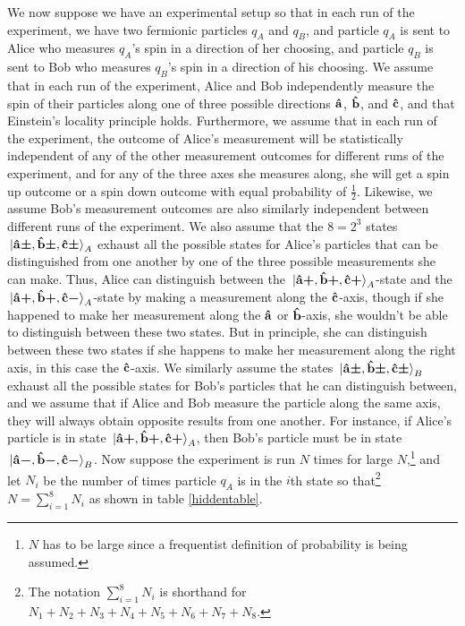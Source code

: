       We now suppose we have an experimental setup so that in each run of the experiment, we have two fermionic particles $q_A$ and $q_B$,  and particle $q_A$ is sent to Alice who measures $q_A$'s spin in a direction of her choosing, and particle $q_B$ is sent to Bob who measures $q_B$'s spin in a direction of his choosing. We assume that in each run of the experiment, Alice and Bob independently measure the spin of their particles along one of three possible directions $\vb{\hat{{a}}}$, $\vb{\hat{{b}}}$, and $\vb{\hat{{c}}}$, and that Einstein's locality principle holds. Furthermore, we assume that in each run of the experiment, the outcome of Alice's measurement will be statistically independent of any of the other measurement outcomes for different runs of the experiment, and for any of the three axes she measures along, she will get a spin up outcome or a spin down outcome with equal probability of $\frac{1}{2}.$ Likewise, we assume Bob's measurement outcomes are also similarly independent between different runs of the experiment. We also assume that the $8=2^3$ states $\ket*{\vb{\hat{{a}}}\bm{\pm},\vb{\hat{{b}}}\bm{\pm},\vb{\hat{{c}}}\bm{\pm}}_A$ exhaust all the possible states for Alice's particles that can be distinguished from one another by one of the three possible measurements she can make. Thus, Alice can distinguish between the $\ket*{\vb{\hat{{a}}}\bm{+},\vb{\hat{{b}}}\bm{+},\vb{\hat{{c}}}\bm{+}}_A$-state and the $\ket*{\vb{\hat{{a}}}\bm{+},\vb{\hat{{b}}}\bm{+},\vb{\hat{{c}}}\bm{-}}_A$-state by making a measurement along the $\vb{\hat{{c}}}$-axis, though if she happened to make her measurement along the $\vb{\hat{{a}}}$ or $\vb{\hat{{b}}}$-axis, she wouldn't be able to distinguish between these two states. But in principle, she can distinguish between these two states if she happens to make her measurement along the right axis, in this case the $\vb{\hat{{c}}}$-axis. We similarly assume the states $\ket*{\vb{\hat{{a}}}\bm{\pm},\vb{\hat{{b}}}\bm{\pm},\vb{\hat{{c}}}\bm{\pm}}_B$  exhaust all the possible states for Bob's particles that he can distinguish between, and we assume that if Alice and Bob measure the particle along the same axis, they will always obtain opposite results from one another. For instance, if Alice's particle is in state $\ket*{\vb{\hat{{a}}}\bm{+},\vb{\hat{{b}}}\bm{+},\vb{\hat{{c}}}\bm{+}}_A$, then Bob's particle must be in state $\ket*{\vb{\hat{{a}}}\bm{-},\vb{\hat{{b}}}\bm{-},\vb{\hat{{c}}}\bm{-}}_B$. Now suppose the experiment is run $N$ times for large $N$,\footnote{$N$ has to be large since a frequentist definition of probability is being assumed.} and let $N_i$ be the number of times particle $q_A$ is in the $i$th state so that\footnote{The notation $\sum_{i=1}^8 N_i$ is shorthand for $N_1+N_2+N_3+N_4+N_5+N_6+N_7+N_8$.} $N=\sum_{i=1}^8 N_i$ as shown in table \ref{hiddentable}.
      
